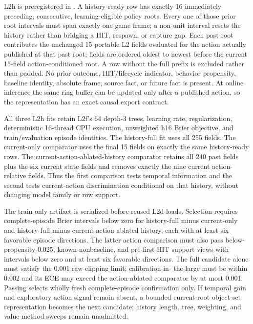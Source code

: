 \documentclass[11pt]{article}
\begin{document}
L2h is preregistered in
.  A history-ready row has
exactly 16 immediately preceding, consecutive, learning-eligible policy roots.
Every one of those prior root intervals must span exactly one game frame; a
non-unit interval resets the history rather than bridging a HIT, respawn, or
capture gap.
Each past root contributes the unchanged 15 portable L2 fields evaluated for
the action actually published at that past root; fields are ordered oldest to
newest before the current 15-field action-conditioned root.  A row without the
full prefix is excluded rather than padded.  No prior outcome, HIT/lifecycle
indicator, behavior propensity, baseline identity, absolute frame, source
fact, or future fact is present.  At online inference the same ring buffer can
be updated only after a published action, so the representation has an exact
causal export contract.

All three L2h fits retain L2f's 64 depth-3 trees, learning rate,
regularization, deterministic 16-thread CPU execution, unweighted h16 Brier
objective, and train/evaluation episode identities.  The history-full fit uses all 255
fields.  The current-only comparator uses the final 15 fields on exactly the
same history-ready rows.  The current-action-ablated-history comparator retains
all 240 past fields plus the six current state fields and removes exactly the
nine current action-relative fields.  Thus the first comparison tests temporal
information and the second tests current-action discrimination conditional on
that history, without changing model family or row support.

The train-only artifact is serialized before reused L2d loads.  Selection
requires complete-episode Brier intervals below zero for history-full minus
current-only and history-full minus current-action-ablated history, each with at
least six favorable episode directions.  The latter action comparison must
also pass below-propensity-0.025, known-nonbaseline, and pre-first-HIT support
views with intervals below zero and at least six favorable directions.  The
full candidate alone must satisfy the 0.001 raw-clipping limit; calibration-in-
the-large must be within 0.002 and its ECE may exceed the action-ablated
comparator by at most 0.001.  Passing selects wholly fresh complete-episode
confirmation only.  If temporal gain and exploratory action signal remain
absent, a bounded current-root object-set representation becomes the next
candidate; history length, tree, weighting, and value-method sweeps remain
unadmitted.
\end{document}
